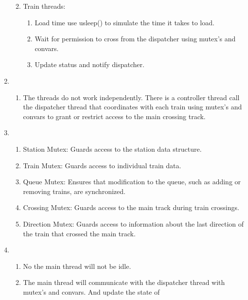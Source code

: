 \documentclass[10pt]{article}
\begin{document}
\begin{enumerate}
\begin{enumerate}
\begin{enumerate}
                \end{enumerate}
            \item Train threads:
                \begin{enumerate}
                    \item Load time use usleep() to simulate the time it takes
                        to load. 
                    \item Wait for permission to cross from the dispatcher 
                        using mutex's and convars.
                    \item
                        Update status and notify dispatcher.
                \end{enumerate}
        \end{enumerate}
    \item
        \begin{enumerate}
            \item The threads do not work independently. There is a controller thread
                call the dispatcher thread that coordinates with each train 
                using mutex's and convars to grant or restrict access to the 
                main crossing track.
        \end{enumerate}
    \item
        \begin{enumerate}
            \item Station Mutex: Guards access to the station data structure.
            \item Train Mutex: Guards access to individual train data.
            \item Queue Mutex: Ensures that modification to the queue, such
                as adding or removing trains, are synchronized. 
            \item Crossing Mutex: Guards access to the main track during train crossings. 
            \item Direction Mutex: Guards access to information about the last
                direction of the train that crossed the main track.
        \end{enumerate}
    \item
        \begin{enumerate}
            \item No the main thread will not be idle.
            \item The main thread will communicate with the dispatcher thread
                with mutex's and convars. And update the state of 

\end{enumerate}
\end{enumerate}
\end{document}
